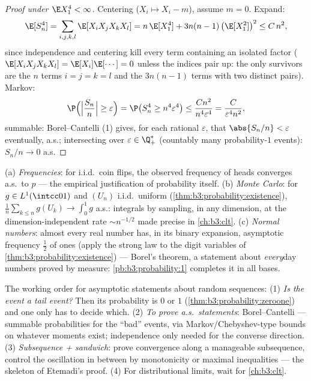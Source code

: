 \begin{proof}[Proof under $\E X_1^4 < \infty$]
Centering ($X_i \mapsto X_i - m$), assume $m = 0$. Expand:
\[
\E[S_n^4] = \sum_{i,j,k,l}\E[X_iX_jX_kX_l]
= n\,\E[X_1^4] + 3n(n-1)\,\bigl(\E[X_1^2]\bigr)^2 \leq
C\,n^2 ,
\]
since independence and centering kill every term containing
an isolated factor ($\E[X_iX_jX_kX_l] =
\E[X_i]\E[\cdots] = 0$ unless the indices pair up: the only
survivors are the $n$ terms $i=j=k=l$ and the $3n(n-1)$
terms with two distinct pairs). Markov:
\[
\P\Bigl(\Bigl|\frac{S_n}n\Bigr| \geq \varepsilon\Bigr)
= \P\bigl(S_n^4 \geq n^4\varepsilon^4\bigr)
\leq \frac{Cn^2}{n^4\varepsilon^4} =
\frac{C}{\varepsilon^4n^2},
\]
summable: Borel--Cantelli (1) gives, for each rational
$\varepsilon$, that $\abs{S_n/n} < \varepsilon$ eventually,
a.s.; intersecting over $\varepsilon \in \Q_+^*$ (countably
many probability-$1$ events): $S_n/n \to 0$ a.s.
\end{proof}

\begin{example}
\label{ex:b3:probability:sllnapps}
(a) \emph{Frequencies}: for i.i.d.\ coin flips, the observed
frequency of heads converges a.s.\ to $p$ --- the empirical
justification of probability itself.
(b) \emph{Monte Carlo}: for $g \in
L^1(\intcc01)$ and $(U_n)$ i.i.d.\ uniform
(\cref{thm:b3:probability:existence}),
$\frac1n\sum_{k\leq n}g(U_k) \to \int_0^1g$ a.s.: integrals
by sampling, in any dimension, at the dimension-independent
rate $\sim n^{-1/2}$ made precise in \cref{ch:b3:clt}.
(c) \emph{Normal numbers}: almost every real number has, in
its binary expansion, asymptotic frequency $\frac12$ of ones
(apply the strong law to the digit variables of
\cref{thm:b3:probability:existence}) --- Borel's theorem, a
statement about \emph{every}day numbers proved by measure:
\cref{pb:b3:probability:1} completes it in all bases.
\end{example}

\begin{method}\label{met:b3:probability:toolkit}
The working order for asymptotic statements about random
sequences: (1) \emph{Is the event a tail event?} Then its
probability is $0$ or $1$
(\cref{thm:b3:probability:zeroone}) and one only has to
decide which. (2) \emph{To prove a.s.\ statements}:
Borel--Cantelli --- summable probabilities for the
``bad'' events, via Markov/Chebyshev-type bounds on
whatever moments exist; independence only needed for the
converse direction. (3) \emph{Subsequence + sandwich}: prove
convergence along a manageable subsequence, control the
oscillation in between by monotonicity or maximal
inequalities --- the skeleton of Etemadi's proof. (4) For
distributional limits, wait for \cref{ch:b3:clt}.
\end{method}

